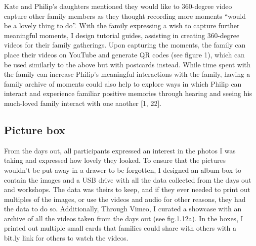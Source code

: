 Kate and Philip's daughters mentioned they would like to 360-degree video capture other family members as they thought recording more moments ``would be a lovely thing to do''. With the family expressing a wish to capture further meaningful moments, I design tutorial guides, assisting in creating 360-degree videos for their family gatherings. Upon capturing the moments, the family can place their videos on YouTube and generate QR codes (see figure 1), which can be used similarly to the above but with postcards instead. While time spent with the family can increase Philip’s meaningful interactions with the family, having a family archive of moments could also help to explore ways in which Philip can interact and experience familiar positive memories through hearing and seeing his much-loved family interact with one another [1, 22].

\subsection{Picture box}
\label{PictureBox}
From the days out, all participants expressed an interest in the photos I was taking and expressed how lovely they looked. To ensure that the pictures wouldn't be put away in a drawer to be forgotten, I designed an album box to contain the images and a USB drive with all the data collected from the days out and workshops. The data was theirs to keep, and if they ever needed to print out multiples of the images, or use the videos and audio for other reasons, they had the data to do so. Additionally, Through Vimeo, I curated a showcase with an archive of all the videos taken from the days out (see fig.1.12a). In the boxes, I printed out multiple small cards that families could share with others with a bit.ly link for others to watch the videos. 

